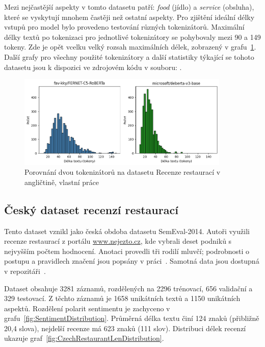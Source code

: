 Mezi nejčastější aspekty v tomto datasetu patří: \emph{food} (jídlo) a \emph{service} (obsluha), které se vyskytují mnohem častěji než ostatní aspekty. Pro zjištění ideální délky vstupů pro model bylo provedeno testování různých tokenizátorů. Maximální délky textů po tokenizaci pro jednotlivé tokenizátory se pohybovaly mezi 90 a 149 tokeny. Zde je opět vcelku velký rozsah maximálních délek, zobrazený v grafu~\ref{fig:RestaurantToken}. Další grafy pro všechny použité tokenizátory a další statistiky týkající se tohoto datasetu jsou k dispozici ve zdrojovém kódu v souboru: .

\begin{figure}[ht]
    \centering
    \includegraphics[width=0.9\textwidth]{images/restaurantsToken}
    \caption[Porovnání dvou tokenizátorů na datasetu Recenze restaurací v angličtině]%
    {Porovnání dvou tokenizátorů na datasetu Recenze restaurací v angličtině, vlastní práce}
    \label{fig:RestaurantToken}
\end{figure}

\subsection{Český dataset recenzí restaurací}

Tento dataset vznikl jako česká obdoba datasetu SemEval-2014. Autoři využili recenze restaurací z portálu \url{www.nejezto.cz}, kde vybrali deset podniků s nejvyšším počtem hodnocení. Anotaci provedli tři rodilí mluvčí; podrobnosti o postupu a pravidlech značení jsou popsány v práci~\cite{steinberger-etal-2014-aspect}. Samotná data jsou dostupná v repozitáři~\cite{CzechRestaurants}.

Dataset obsahuje 3281 záznamů, rozdělených na 2296 trénovací, 656 validační a 329 testovací. Z těchto záznamů je 1658 unikátních textů a 1150 unikátních aspektů. Rozdělení polarit sentimentu je zachyceno v grafu~\ref{fig:SentimentDistribution}. Průměrná délka textu činí 124 znaků (přibližně 20,4 slova), nejdelší recenze má 623 znaků (111 slov). Distribuci délek recenzí ukazuje graf~\ref{fig:CzechRestaurantLenDistribution}.

